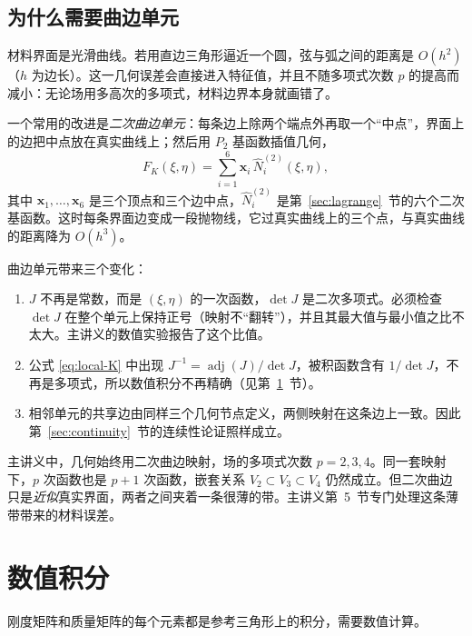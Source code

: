 \documentclass[11pt,a4paper,fontset=fandol]{ctexart}
\begin{document}
\subsection{为什么需要曲边单元}

材料界面是光滑曲线。若用直边三角形逼近一个圆，弦与弧之间的距离是 $O(h^2)$（$h$ 为边长）。这一几何误差会直接进入特征值，并且不随多项式次数 $p$ 的提高而减小：无论场用多高次的多项式，材料边界本身就画错了。

一个常用的改进是\emph{二次曲边单元}：每条边上除两个端点外再取一个“中点”，界面上的边把中点放在真实曲线上；然后用 $P_2$ 基函数插值几何，
\begin{equation}
\label{eq:p2-map}
F_K(\xi,\eta)=\sum_{i=1}^6\bm x_i\,\widehat N^{(2)}_i(\xi,\eta),
\end{equation}
其中 $\bm x_1,\dots,\bm x_6$ 是三个顶点和三个边中点，$\widehat N^{(2)}_i$ 是第~\ref{sec:lagrange}~节的六个二次基函数。这时每条界面边变成一段抛物线，它过真实曲线上的三个点，与真实曲线的距离降为 $O(h^3)$。

曲边单元带来三个变化：
\begin{enumerate}
\item $J$ 不再是常数，而是 $(\xi,\eta)$ 的一次函数，$\det J$ 是二次多项式。必须检查 $\det J$ 在整个单元上保持正号（映射不“翻转”），并且其最大值与最小值之比不太大。主讲义的数值实验报告了这个比值。
\item 公式 \eqref{eq:local-K} 中出现 $J^{-1}=\operatorname{adj}(J)/\det J$，被积函数含有 $1/\det J$，不再是多项式，所以数值积分不再精确（见第~\ref{sec:quad}~节）。
\item 相邻单元的共享边由同样三个几何节点定义，两侧映射在这条边上一致。因此第~\ref{sec:continuity}~节的连续性论证照样成立。
\end{enumerate}

\begin{keypoint}
主讲义中，几何始终用二次曲边映射，场的多项式次数 $p=2,3,4$。同一套映射下，$p$ 次函数也是 $p+1$ 次函数，嵌套关系 $V_2\subset V_3\subset V_4$ 仍然成立。但二次曲边只是\emph{近似}真实界面，两者之间夹着一条很薄的带。主讲义第~5~节专门处理这条薄带带来的材料误差。
\end{keypoint}

\section{数值积分}
\label{sec:quad}

刚度矩阵和质量矩阵的每个元素都是参考三角形上的积分，需要数值计算。
\end{document}
